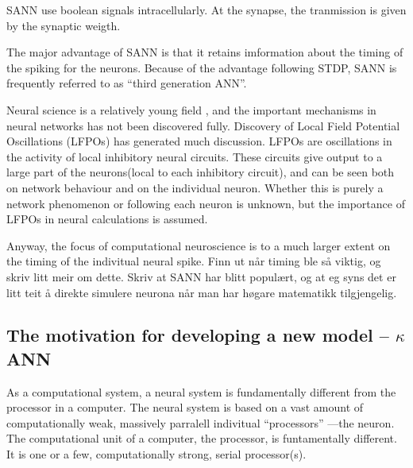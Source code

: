 SANN use boolean signals intracellularly. At the synapse, the tranmission is given by the synaptic weigth. 

The major advantage of SANN is that it retains imformation about the timing of the spiking for the neurons.  %
Because of the advantage following STDP, SANN is frequently referred to as ``third generation ANN''. 

Neural science is a relatively young field %
	, and the important mechanisms in neural networks has not been discovered fully. %
Discovery of Local Field Potential Oscillations (LFPOs) has generated much discussion. LFPOs are oscillations in the activity of local inhibitory neural circuits. 
These circuits give output to a large part of the neurons(local to each inhibitory circuit), and can be seen both on network behaviour and on the individual neuron. 
Whether this is purely a network phenomenon or following each neuron is unknown, but the importance of LFPOs in neural calculations is assumed. %

Anyway, the focus of computational neuroscience is to a much larger extent on the timing of the indivitual neural spike. 
Finn ut når timing ble så viktig, og skriv litt meir om dette. Skriv at SANN har blitt populært, og at eg syns det er litt teit å direkte simulere neurona når man har høgare matematikk tilgjengelig.




\subsection{The motivation for developing a new model -- $\kappa$ANN}
As a computational system, a neural system is fundamentally different from the processor in a computer. 
The neural system is based on a vast amount of computationally weak, massively parralell indivitual ``processors'' ---the neuron. 
The computational unit of a computer, the processor, is funtamentally different. It is one or a few, computationally strong, serial processor(s). 

